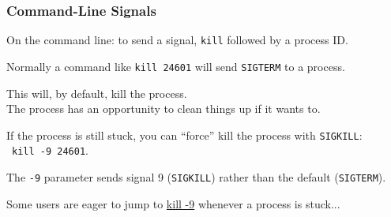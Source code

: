 \begin{frame}
	\frametitle{Command-Line Signals}

	On the command line: to send a signal, \texttt{kill} followed by a process ID.

	Normally a command like \texttt{kill 24601} will send \texttt{SIGTERM} to a process.

	This will, by default, kill the process.\\
	\quad The process has an opportunity to clean things up if it wants to.

	If the process is still stuck, you can ``force'' kill the process with \texttt{SIGKILL}:\\\ \quad \texttt{kill -9 24601}.

	The \texttt{-9} parameter sends signal 9 (\texttt{SIGKILL}) rather than the default (\texttt{SIGTERM}).

	Some users are eager to jump to \href{https://www.youtube.com/watch?v=0rG74rG_ubs&ab_channel=alterlandnet}{kill -9} whenever a process is stuck...
\end{frame}








